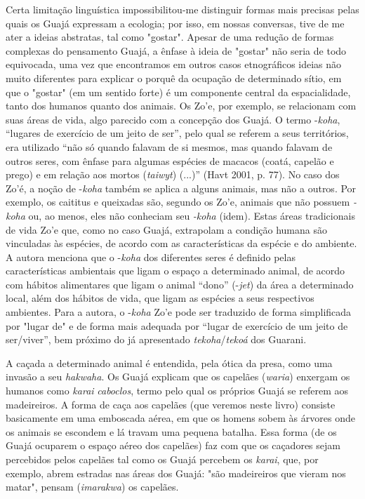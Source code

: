 Certa limitação linguística impossibilitou-me distinguir formas mais
precisas pelas quais os Guajá expressam a ecologia; por isso, em nossas
conversas, tive de me ater a ideias abstratas, tal como "gostar". Apesar
de uma redução de formas complexas do pensamento Guajá, a ênfase à ideia
de "gostar" não seria de todo equivocada, uma vez que encontramos em
outros casos etnográficos ideias não muito diferentes para explicar o
porquê da ocupação de determinado sítio, em que o "gostar" (em um
sentido forte) é um componente central da espacialidade, tanto dos
humanos quanto dos animais. Os Zo'e, por exemplo, se relacionam com suas
áreas de vida, algo parecido com a concepção dos Guajá. O termo
-\emph{koha}, ``lugares de exercício de um jeito de ser'', pelo qual se
referem a seus territórios, era utilizado ``não só quando falavam de si
mesmos, mas quando falavam de outros seres, com ênfase para algumas
espécies de macacos (coatá, capelão e prego) e em relação aos mortos
(\emph{taiwyt}) (...)'' (Havt 2001, p. 77). No caso dos Zo'é, a noção de
-\emph{koha} também se aplica a alguns animais, mas não a outros. Por
exemplo, os caititus e queixadas são, segundo os Zo'e, animais que não
possuem \emph{-koha} ou, ao menos, eles não conheciam seu \emph{-koha}
(idem). Estas áreas tradicionais de vida Zo'e que, como no caso Guajá,
extrapolam a condição humana são vinculadas às espécies, de acordo com
as características da espécie e do ambiente. A autora menciona que o
-\emph{koha} dos diferentes seres é definido pelas características
ambientais que ligam o espaço a determinado animal, de acordo com
hábitos alimentares que ligam o animal ``dono'' (-\emph{jet}) da área a
determinado local, além dos hábitos de vida, que ligam as espécies a
seus respectivos ambientes. Para a autora, o -\emph{koha} Zo'e pode ser
traduzido de forma simplificada por "lugar de" e de forma mais adequada
por ``lugar de exercício de um jeito de ser/viver'', bem próximo do já
apresentado \emph{tekoha}/\emph{tekoá} dos Guarani.

A caçada a determinado animal é entendida, pela ótica da presa, como uma
invasão a seu \emph{hakwaha}. Os Guajá explicam que os capelães
(\emph{waria}) enxergam os humanos como \emph{karai} \emph{caboclos},
termo pelo qual os próprios Guajá se referem aos madeireiros. A forma de
caça aos capelães (que veremos neste livro) consiste basicamente em uma
emboscada aérea, em que os homens sobem às árvores onde os animais se
escondem e lá travam uma pequena batalha. Essa forma (de os Guajá
ocuparem o espaço aéreo dos capelães) faz com que os caçadores sejam
percebidos pelos capelães tal como os Guajá percebem os \emph{karai},
que, por exemplo, abrem estradas nas áreas dos Guajá: "são madeireiros
que vieram nos matar", pensam (\emph{imarakwa}) os capelães.

